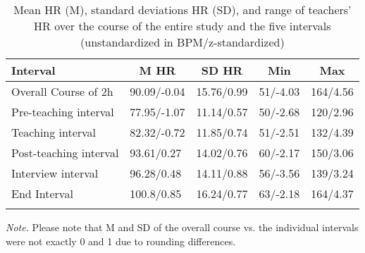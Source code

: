


\begin{table}[h]

\begin{center}
\begin{threeparttable}

\caption{Mean HR (M), standard deviations HR (SD), and range of teachers’ HR over the course of the entire study and the five intervals (unstandardized in BPM/z-standardized)}

\begin{tabular}{lllll}
\toprule
Interval & \multicolumn{1}{c}{M HR} & \multicolumn{1}{c}{SD HR} & \multicolumn{1}{c}{Min} & \multicolumn{1}{c}{Max}\\
\midrule
Overall Course of 2h & 90.09/-0.04 & 15.76/0.99 & 51/-4.03 & 164/4.56\\
Pre-teaching interval & 77.95/-1.07 & 11.14/0.57 & 50/-2.68 & 120/2.96\\
Teaching interval & 82.32/-0.72 & 11.85/0.74 & 51/-2.51 & 132/4.39\\
Post-teaching interval & 93.61/0.27 & 14.02/0.76 & 60/-2.17 & 150/3.06\\
Interview interval & 96.28/0.48 & 14.11/0.88 & 56/-3.56 & 139/3.24\\
End Interval & 100.8/0.85 & 16.24/0.77 & 63/-2.18 & 164/4.37\\
\bottomrule
\addlinespace
\end{tabular}

\begin{tablenotes}[para]
\normalsize{\textit{Note.} Please note that M and SD of the overall course vs. the individual intervals were not exactly 0 and 1 due to rounding differences.}
\end{tablenotes}

\end{threeparttable}
\end{center}

\end{table}



